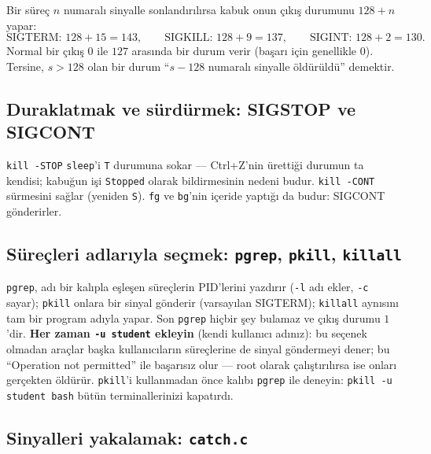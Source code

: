 \documentclass[11pt,a4paper]{article}
\newcommand{\cmd}[1]{\texttt{#1}}
\begin{document}
\begin{keyidea}
Bir süreç $n$ numaralı sinyalle sonlandırılırsa kabuk onun çıkış durumunu $128 + n$ yapar:
\[
\text{SIGTERM: } 128 + 15 = 143, \qquad \text{SIGKILL: } 128 + 9 = 137, \qquad \text{SIGINT: } 128 + 2 = 130 .
\]
Normal bir çıkış $0$ ile $127$ arasında bir durum verir (başarı için genellikle $0$). Tersine, $s > 128$ olan bir durum ``$s - 128$ numaralı sinyalle öldürüldü'' demektir.
\end{keyidea}

\subsection{Duraklatmak ve sürdürmek: SIGSTOP ve SIGCONT}



\cmd{kill -STOP} \cmd{sleep}'i \texttt{T} durumuna sokar --- Ctrl+Z'nin ürettiği durumun ta kendisi; kabuğun işi \texttt{Stopped} olarak bildirmesinin nedeni budur. \cmd{kill -CONT} sürmesini sağlar (yeniden \texttt{S}). \cmd{fg} ve \cmd{bg}'nin içeride yaptığı da budur: SIGCONT gönderirler.

\subsection{Süreçleri adlarıyla seçmek: \texttt{pgrep}, \texttt{pkill}, \texttt{killall}}
\label{sec:pkill}



\cmd{pgrep}, adı bir kalıpla eşleşen süreçlerin PID'lerini yazdırır (\cmd{-l} adı ekler, \cmd{-c} sayar); \cmd{pkill} onlara bir sinyal gönderir (varsayılan SIGTERM); \cmd{killall} aynısını tam bir program adıyla yapar. Son \cmd{pgrep} hiçbir şey bulamaz ve çıkış durumu $1$'dir. \textbf{Her zaman \cmd{-u student} ekleyin} (kendi kullanıcı adınız): bu seçenek olmadan araçlar başka kullanıcıların süreçlerine de sinyal göndermeyi dener; bu ``Operation not permitted'' ile başarısız olur --- root olarak çalıştırılırsa ise onları gerçekten öldürür. \cmd{pkill}'i kullanmadan önce kalıbı \cmd{pgrep} ile deneyin: \cmd{pkill -u student bash} bütün terminallerinizi kapatırdı.

\subsection{Sinyalleri yakalamak: \texttt{catch.c}}
\end{document}
